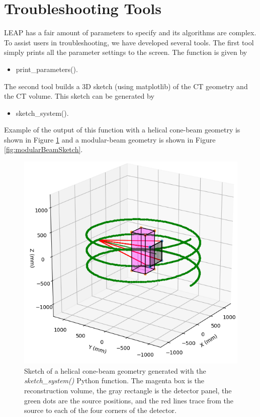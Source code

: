 \documentclass[11pt]{article}
\begin{document}
\section{Troubleshooting Tools}

LEAP has a fair amount of parameters to specify and its algorithms are complex.  To assist users in troubleshooting, we have developed several tools.  The first tool simply prints all the parameter settings to the screen.  The function is given by
\begin{itemize}
    \item[] print\_parameters().
\end{itemize}
The second tool builds a 3D sketch (using matplotlib) of the CT geometry and the CT volume.  This sketch can be generated by
\begin{itemize}
    \item[] sketch\_system().
\end{itemize}
Example of the output of this function with a helical cone-beam geometry is shown in Figure \ref{fig:helicalSketch} and a modular-beam geometry is shown in Figure \ref{fig:modularBeamSketch}.

\begin{figure}[h!]
\begin{center}
\includegraphics[scale=0.5]{helical}
\end{center}
\vspace{-20pt}\caption{Sketch of a helical cone-beam geometry generated with the \textit{sketch\_system()} Python function.  The  magenta box is the reconstruction volume, the gray rectangle is the detector panel, the green dots are the source positions, and the red lines trace from the source to each of the four corners of the detector.} \label{fig:helicalSketch}
\end{figure}
\end{document}

